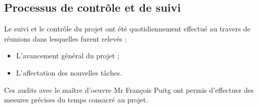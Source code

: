 \subsection{Processus de contrôle et de suivi}

Le suivi et le contrôle du projet ont été quotidiennement effectué au travers de réunions dans lesquelles furent relevés : 
\begin{itemize}
 \item L'avancement général du projet ;
 \item L'affectation des nouvelles tâches.
\end{itemize}

Ces audits avec le maître d’oeuvre Mr François Puitg ont permis d'effectuer des mesures précises du temps consacré au projet.



